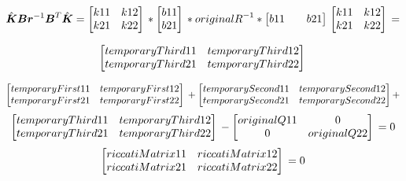 \documentclass[a4paper]{article}
\begin{document}
\[
\hat{\boldsymbol{K}}\boldsymbol{B}\boldsymbol{r}^{-1}\boldsymbol{B}^T\hat{\boldsymbol{K}} =
\begin{bmatrix}
    k11 & k12 \\
    k21 & k22 \\
\end{bmatrix}\\ *
\begin{bmatrix}
    {{b11}} \\
    {{b21}} \\
\end{bmatrix}\\ *
{{originalR}}^{-1} *
\begin{bmatrix}
    {{b11}} &&
    {{b21}} 
\end{bmatrix}\\
\begin{bmatrix}
    k11 & k12 \\
    k21 & k22 \\
\end{bmatrix}\\ = 
\]

\[
\begin{bmatrix}
    {{temporaryThird11}} & {{temporaryThird12}} \\
    {{temporaryThird21}} & {{temporaryThird22}} \\
\end{bmatrix}\\
\]


\[
\begin{bmatrix}
    {{temporaryFirst11}} & {{temporaryFirst12}} \\
    {{temporaryFirst21}} & {{temporaryFirst22}} \\
\end{bmatrix}\\+
\begin{bmatrix}
    {{temporarySecond11}} & {{temporarySecond12}} \\
    {{temporarySecond21}} & {{temporarySecond22}} \\
\end{bmatrix}\\+
\]
\[
\begin{bmatrix}
    {{temporaryThird11}} & {{temporaryThird12}} \\
    {{temporaryThird21}} & {{temporaryThird22}} \\
\end{bmatrix}\\-
\begin{bmatrix}
    {{originalQ11}} & 0 \\
    0 & {{originalQ22}} \\
\end{bmatrix}\\ = 0
\]
\[
\begin{bmatrix}
    {{riccatiMatrix11}} & {{riccatiMatrix12}}\\
    {{riccatiMatrix21}} & {{riccatiMatrix22}} \\
\end{bmatrix}\\ = 0
\]
\end{document}
